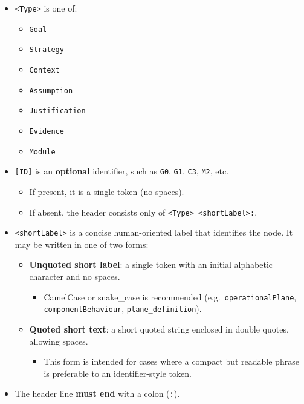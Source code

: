 \documentclass[11pt]{article}
\begin{document}
\begin{itemize}[leftmargin=2em]
  \item \texttt{\textless Type\textgreater{}} is one of:
  \begin{itemize}[leftmargin=1.5em]
    \item \texttt{Goal}
    \item \texttt{Strategy}
    \item \texttt{Context}
    \item \texttt{Assumption}
    \item \texttt{Justification}
    \item \texttt{Evidence}
    \item \texttt{Module}
  \end{itemize}

  \item \texttt{[ID]} is an \textbf{optional} identifier, such as \texttt{G0}, \texttt{G1}, \texttt{C3}, \texttt{M2}, etc.
  \begin{itemize}[leftmargin=1.5em]
    \item If present, it is a single token (no spaces).
    \item If absent, the header consists only of \texttt{\textless Type\textgreater{} \textless shortLabel\textgreater:}.
  \end{itemize}

  \item \texttt{\textless shortLabel\textgreater{}} is a concise human-oriented label that identifies the node.
  It may be written in one of two forms:
  \begin{itemize}[leftmargin=1.5em]
    \item \textbf{Unquoted short label}: a single token with an initial alphabetic character and no spaces.
    \begin{itemize}[leftmargin=1.5em]
      \item CamelCase or snake\_case is recommended (e.g.\ \texttt{operationalPlane}, \texttt{componentBehaviour}, \texttt{plane\_definition}).
    \end{itemize}
    \item \textbf{Quoted short text}: a short quoted string enclosed in double quotes, allowing spaces.
    \begin{itemize}[leftmargin=1.5em]
      \item This form is intended for cases where a compact but readable phrase is preferable to an identifier-style token.
    \end{itemize}
  \end{itemize}

  \item The header line \textbf{must end} with a colon (\texttt{:}).
\end{itemize}
\end{document}
